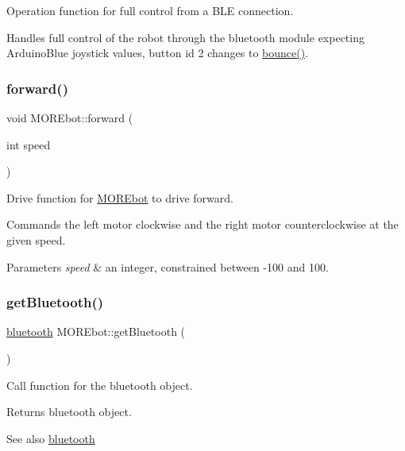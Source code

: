 Operation function for full control from a B\+LE connection. 

Handles full control of the robot through the bluetooth module expecting Arduino\+Blue joystick values, button id 2 changes to \mbox{\hyperlink{class_m_o_r_ebot_a2a685de71254397a986edaad9b22c8ef}{bounce()}}. \mbox{\label{class_m_o_r_ebot_ac5646dd5b3bb754375f4516520d3774a}} 
\subsubsection{\texorpdfstring{forward()}{forward()}}
{\footnotesize\ttfamily void M\+O\+R\+Ebot\+::forward (\begin{DoxyParamCaption}\item[{int}]{speed }\end{DoxyParamCaption})}



Drive function for \mbox{\hyperlink{class_m_o_r_ebot}{M\+O\+R\+Ebot}} to drive forward. 

Commands the left motor clockwise and the right motor counterclockwise at the given speed. 
\begin{DoxyParams}{Parameters}
{\em speed} & an integer, constrained between -\/100 and 100. \\
\hline
\end{DoxyParams}
\mbox{\label{class_m_o_r_ebot_a339a4d8f12504ab13e419f38ab04c864}} 
\subsubsection{\texorpdfstring{getBluetooth()}{getBluetooth()}}
{\footnotesize\ttfamily \mbox{\hyperlink{classbluetooth}{bluetooth}} M\+O\+R\+Ebot\+::get\+Bluetooth (\begin{DoxyParamCaption}{ }\end{DoxyParamCaption})}



Call function for the bluetooth object. 

\begin{DoxyReturn}{Returns}
bluetooth object. 
\end{DoxyReturn}
\begin{DoxySeeAlso}{See also}
\mbox{\hyperlink{classbluetooth}{bluetooth}} 
\end{DoxySeeAlso}
\mbox{\label{class_m_o_r_ebot_aefc49a4089db0e15f57dd7f8a27ad27c}} 
